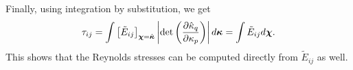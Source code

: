 \documentclass[oneside,a4paper,11pt]{report}
\newcommand{\rs}{\tau}          %
\newcommand{\est}{E}            %
\newcommand{\kappavec}{\boldsymbol{\kappa}}
\newcommand{\uifluc}{u_i}
\newcommand{\ujfluc}{u_j}
\begin{document}
Finally, using integration by substitution, we get
\begin{equation}
    \rs_{ij} = \int \left [ \tilde{\est}_{ij} \right ]_{\chivec = \hat{\kappavec}} \left | \det \left (\frac{\partial \hat{\kappa}_q}{\partial \kappa_p} \right ) \right | d\kappavec = \int \tilde{\est}_{ij} d\chivec.
\end{equation}
This shows that the Reynolds stresses can be computed directly from $\tilde{\est}_{ij}$ as well.

%
%
\end{document}
